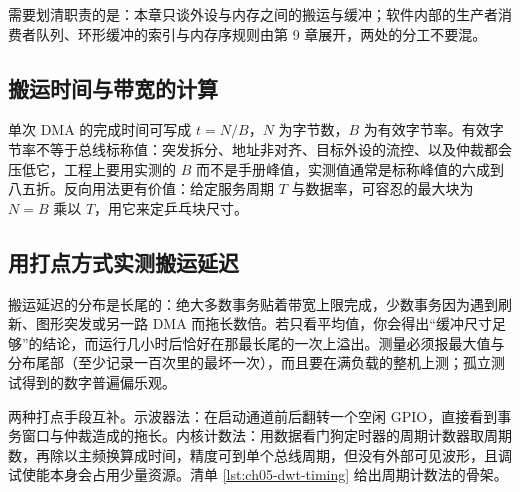 \documentclass[12pt,a4paper,fontset=fandol]{ctexbook}
\begin{document}
需要划清职责的是：本章只谈外设与内存之间的搬运与缓冲；软件内部的生产者消费者队列、环形缓冲的索引与内存序规则由第 9 章展开，两处的分工不要混。

\subsection{搬运时间与带宽的计算}

单次 DMA 的完成时间可写成 $t = N / B$，$N$ 为字节数，$B$ 为有效字节率。有效字节率不等于总线标称值：突发拆分、地址非对齐、目标外设的流控、以及仲裁都会压低它，工程上要用实测的 $B$ 而不是手册峰值，实测值通常是标称峰值的六成到八五折。反向用法更有价值：给定服务周期 $T$ 与数据率，可容忍的最大块为 $N = B$ 乘以 $T$，用它来定乒乓块尺寸。

\subsection{用打点方式实测搬运延迟}

\begin{warning}[title={只测平均搬运时间会掩盖总线仲裁造成的尖峰}]
搬运延迟的分布是长尾的：绝大多数事务贴着带宽上限完成，少数事务因为遇到刷新、图形突发或另一路 DMA 而拖长数倍。若只看平均值，你会得出``缓冲尺寸足够''的结论，而运行几小时后恰好在那最长尾的一次上溢出。测量必须报最大值与分布尾部（至少记录一百次里的最坏一次），而且要在满负载的整机上测；孤立测试得到的数字普遍偏乐观。
\end{warning}

两种打点手段互补。示波器法：在启动通道前后翻转一个空闲 GPIO，直接看到事务窗口与仲裁造成的拖长。内核计数法：用数据看门狗定时器的周期计数器取周期数，再除以主频换算成时间，精度可到单个总线周期，但没有外部可见波形，且调试使能本身会占用少量资源。清单 \ref{lst:ch05-dwt-timing} 给出周期计数法的骨架。
\end{document}
